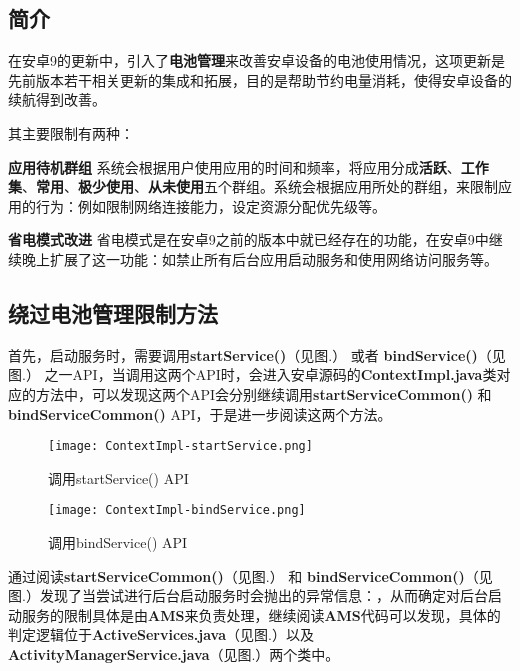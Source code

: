 \subsection{简介}

在安卓9的更新中，引入了\textbf{电池管理}\cite{histroyofpms}来改善安卓设备的电池使用情况，这项更新是先前版本若干相关更新的集成和拓展，目的是帮助节约电量消耗，使得安卓设备的续航得到改善。

其主要限制有两种：

\textbf{应用待机群组} 系统会根据用户使用应用的时间和频率，将应用分成\textbf{活跃}、\textbf{工作集}、\textbf{常用}、\textbf{极少使用}、\textbf{从未使用}五个群组。系统会根据应用所处的群组，来限制应用的行为：例如限制网络连接能力，设定资源分配优先级等。
\newline

\textbf{省电模式改进} 省电模式是在安卓9之前的版本中就已经存在的功能，在安卓9中继续晚上扩展了这一功能：如禁止所有后台应用启动服务和使用网络访问服务等。

\subsection{绕过电池管理限制方法}

首先，启动服务时，需要调用\textbf{startService()}（见图.\redbf{\ref{fig:source code:startService}}） 或者 \textbf{bindService()}（见图.\redbf{\ref{fig:source code:bindService}}）  之一API，当调用这两个API时，会进入安卓源码的\textbf{ContextImpl.java}类对应的方法中，可以发现这两个API会分别继续调用\textbf{startServiceCommon()} 和\textbf{bindServiceCommon()} API，于是进一步阅读这两个方法。

\begin{figure}[htbp]
	\centering
	\texttt{[image: ContextImpl-startService.png]} %
	\caption{调用startService() API}
	\label{fig:source code:startService}
\end{figure}

\begin{figure}[htbp]
	\centering
	\texttt{[image: ContextImpl-bindService.png]} %
	\caption{调用bindService() API}
	\label{fig:source code:bindService}
\end{figure}

通过阅读\textbf{startServiceCommon()}（见图.\redbf{\ref{fig:source code:startServiceCommon}}） 和 \textbf{bindServiceCommon()}（见图.\redbf{\ref{fig:source code:bindServiceCommon}}）发现了当尝试进行后台启动服务时会抛出的异常信息：，从而确定对后台启动服务的限制具体是由\textbf{AMS}来负责处理，继续阅读\textbf{AMS}代码可以发现，具体的判定逻辑位于\textbf{ActiveServices.java}（见图.\redbf{\ref{fig:source code:getAppStartModeLocked}}）以及\textbf{ActivityManagerService.java}（见图.\redbf{\ref{fig:source code:appRestrictedInBackgroundLocked}}）两个类中。

